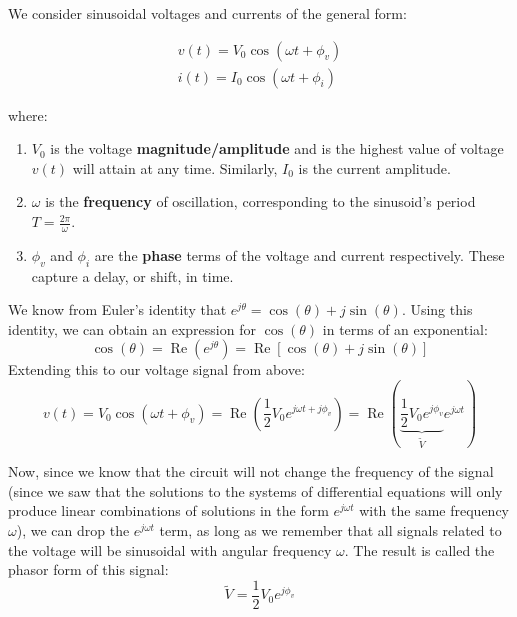 


We consider sinusoidal voltages and currents of the general form:

\vspace{-15px}
\begin{align*}
v(t) = V_0 \cos(\omega t + \phi_v) \\
i(t) = I_0 \cos(\omega t + \phi_i)
\end{align*}
\vspace{-15px}

\renewcommand{\arraystretch}{1.5}

where:

\begin{enumerate}
\item
    $V_0$ is the voltage \textbf{magnitude/amplitude} and is the highest value of voltage $v(t)$ will attain at any time. Similarly, $I_0$ is the current
    amplitude.
\item
    $\omega$ is the \textbf{frequency} of oscillation, corresponding to the sinusoid's period $T = \frac{2\pi}{\omega}$.
\item
    $\phi_v$ and $\phi_i$ are the \textbf{phase} terms of the voltage and current respectively. These capture a delay, or shift, in time.
\end{enumerate}

We know from Euler's identity that $e^{j\theta}=\cos(\theta)+j\sin(\theta)$. Using this identity, we can obtain an expression for $\cos(\theta)$ in terms of an exponential:
\[\cos(\theta)=\operatorname{Re}(e^{j\theta})=\operatorname{Re}[\cos(\theta)+j\sin(\theta)]\]
Extending this to our voltage signal from above:
\[v(t) = V_0 \cos(\omega t + \phi_v)=\operatorname{Re}(\frac{1}{2} V_0 e^{j\omega t + j\phi_v}) = \operatorname{Re}(\underbrace{\frac{1}{2}{V_0 e^{j\phi_v}}}_{\widetilde{V}} e^{j\omega t})\]
\vspace{-10px}

Now, since we know that the circuit will not change the frequency of the signal (since we saw that the solutions to the systems of differential equations will only produce linear combinations of solutions in the form $e^{j\omega t}$ with the same frequency $\omega$), we can drop the $e^{j\omega t}$ term, as long as we remember that all signals related to the voltage will be sinusoidal with angular frequency $\omega$. The result is called the phasor form of this signal:
\[\boxed{\widetilde{V}=\frac{1}{2}V_0e^{j\phi_v}}\]

